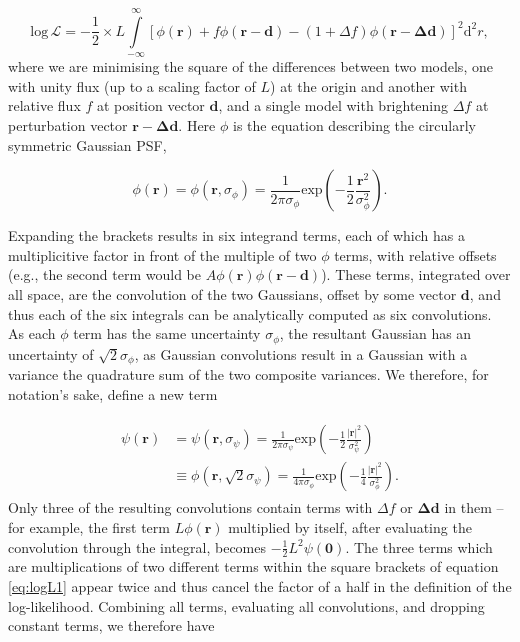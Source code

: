\documentclass[fleqn,usenatbib]{mnras}
\begin{document}
\begin{equation}
    \mathrm{log}\,\mathcal{L} = -\frac{1}{2}\times L \int\limits_{-\infty}^\infty\! \left[\phi(\mathbf{r}) + f\phi(\mathbf{r - d}) - (1 + \Delta f)\phi(\mathbf{r - \Delta d})\right]^2 \mathrm{d}^2r,
\label{eq:logL1}
\end{equation}
where we are minimising the square of the differences between two models, one with unity flux (up to a scaling factor of $L$) at the origin and another with relative flux $f$ at position vector $\mathbf{d}$, and a single model with brightening $\Delta f$ at perturbation vector $\mathbf{r - \Delta d}$. Here $\phi$ is the equation describing the circularly symmetric Gaussian PSF,

\begin{equation}
    \phi(\mathbf{r}) = \phi(\mathbf{r}, \sigma_\phi) = \frac{1}{2\pi \sigma_\phi}\mathrm{exp}\left(-\frac{1}{2} \frac{\mathbf{r}^2}{\sigma_\phi^2}\right).
\end{equation}

Expanding the brackets results in six integrand terms, each of which has a multiplicitive factor in front of the multiple of two $\phi$ terms, with relative offsets (e.g., the second term would be $A\phi(\mathbf{r})\phi(\mathbf{r - d})$). These terms, integrated over all space, are the convolution of the two Gaussians, offset by some vector $\mathbf{d}$, and thus each of the six integrals can be analytically computed as six convolutions. As each $\phi$ term has the same uncertainty $\sigma_\phi$, the resultant Gaussian has an uncertainty of $\sqrt{2}\sigma_\phi$, as Gaussian convolutions result in a Gaussian with a variance the quadrature sum of the two composite variances. We therefore, for notation's sake, define a new term

\begin{align}
\begin{split}
    \psi(\mathbf{r}) &= \psi(\mathbf{r}, \sigma_\psi) = \frac{1}{2\pi \sigma_\psi}\mathrm{exp}\left(-\frac{1}{2} \frac{\lvert\mathbf{r}\lvert^2}{\sigma_\psi^2}\right) \\&\equiv \phi(\mathbf{r}, \sqrt{2}\sigma_\psi) = \frac{1}{4\pi \sigma_\phi}\mathrm{exp}\left(-\frac{1}{4} \frac{\lvert\mathbf{r}\lvert^2}{\sigma_\phi^2}\right).
\end{split}
\end{align}
Only three of the resulting convolutions contain terms with $\Delta f$ or $\mathbf{\Delta d}$ in them -- for example, the first term $L\phi(\mathbf{r})$ multiplied by itself, after evaluating the convolution through the integral, becomes $-\frac{1}{2} L^2 \psi(\mathbf{0})$. The three terms which are multiplications of two different terms within the square brackets of equation \ref{eq:logL1} appear twice and thus cancel the factor of a half in the definition of the log-likelihood. Combining all terms, evaluating all convolutions, and dropping constant terms, we therefore have
\end{document}
